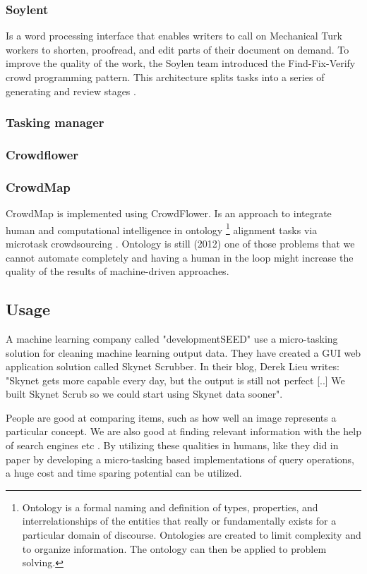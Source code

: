 \subsubsection{Soylent}\label{sec:soylent}
Is a word processing interface that enables writers to call on Mechanical Turk workers to shorten, proofread, and edit parts of their document on demand. To improve the quality of the work, the Soylen team introduced the Find-Fix-Verify crowd programming pattern. This architecture splits tasks into a series of generating and review stages \citep{Bernstein2015a}. 

\subsubsection{Tasking manager}
\subsubsection{Crowdflower}
\subsubsection{CrowdMap}
CrowdMap is implemented using CrowdFlower. 
Is an approach to integrate human and computational intelligence in ontology \footnote{\label{ontology} Ontology is a formal naming and definition of types, properties, and interrelationships of the entities that really or fundamentally exists for a particular domain of discourse. Ontologies are created to limit complexity and to organize information. The ontology can then be applied to problem solving. } alignment tasks via microtask crowdsourcing \citep{Sarasua2012}. Ontology is still (2012) one of those problems that we cannot automate completely and having a human in the loop might increase the quality of the results of machine-driven approaches. 

\subsection{Usage}
A machine learning company called "developmentSEED" use a micro-tasking solution for cleaning machine learning output data. They have created a GUI web application solution called Skynet Scrubber. In their blog, Derek Lieu writes: "Skynet gets more capable every day, but the output is still not perfect [..] We built Skynet Scrub so we could start using Skynet data sooner". 

People are good at comparing items, such as how well an image represents a particular concept. We are also good at finding relevant information with the help of search engines etc \citep{Franklin2011}. By utilizing these qualities in humans, like they did in \citep{Franklin2011} paper by developing a micro-tasking based implementations of query operations, a huge cost and time sparing potential can be utilized. 

